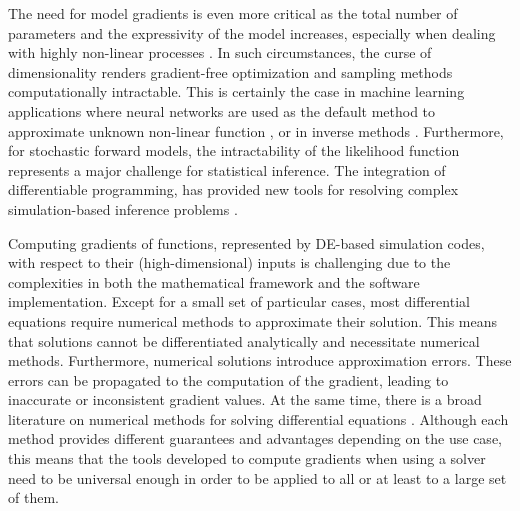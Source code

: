 The need for model gradients is even more critical as the total number of parameters and the expressivity of the model increases, especially when dealing with highly non-linear processes \cite{Karniadakis_Kevrekidis_Lu_Perdikaris_Wang_Yang_2021}.
In such circumstances, the curse of dimensionality renders gradient-free optimization and sampling methods computationally intractable. 
This is certainly the case in machine learning applications where neural networks are used as the default method to approximate unknown non-linear function \cite{LeCun2015},
or in inverse methods \cite{Tarantola:2007wu}. 
Furthermore, for stochastic forward models, the intractability of the likelihood function represents a major challenge for statistical inference.
The integration of differentiable programming, has provided new tools for resolving complex simulation-based inference problems \cite{Cranmer_Brehmer_Louppe_2020}.

Computing gradients of functions, represented by DE-based simulation codes, with respect to their (high-dimensional) inputs is challenging due to the complexities in both the mathematical framework and the software implementation.
Except for a small set of particular cases, most differential equations require numerical methods to approximate their solution.
This means that solutions cannot be differentiated analytically and necessitate numerical methods. 
Furthermore, numerical solutions introduce approximation errors. 
These errors can be propagated to the computation of the gradient, leading to inaccurate or inconsistent gradient values. 
At the same time, there is a broad literature on numerical methods for solving differential equations \cite{hairer-solving-1, hairer-solving-2}. 
Although each method provides different guarantees and advantages depending on the use case, this means that the tools developed to compute gradients when using a solver need to be universal enough in order to be applied to all or at least to a large set of them. 

